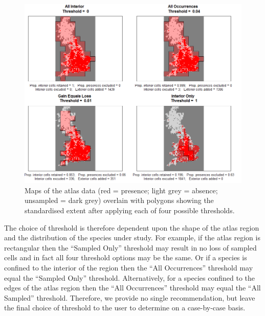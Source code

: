 \documentclass{article}[12pt, a4paper]
\begin{document}
\begin{figure}[!ht]
\centering
\includegraphics[width=\linewidth]{Threshold_maps.png}
\caption{Maps of the atlas data (red = presence; light grey = absence; unsampled = dark grey) overlain with polygons showing the standardised extent after applying each of four possible thresholds.}
\label{fig:Threshold maps}
\end{figure}

The choice of threshold is therefore dependent upon the shape of the atlas region and the distribution of the species under study. For example, if the atlas region is rectangular then the “Sampled Only” threshold may result in no loss of sampled cells and in fact all four threshold options may be the same. Or if a species is confined to the interior of the region then the “All Occurrences” threshold may equal the “Sampled Only” threshold. Alternatively, for a species confined to the edges of the atlas region then the “All Occurrences” threshold may equal the “All Sampled” threshold. Therefore, we provide no single recommendation, but leave the final choice of threshold to the user to determine on a case-by-case basis.
\end{document}
